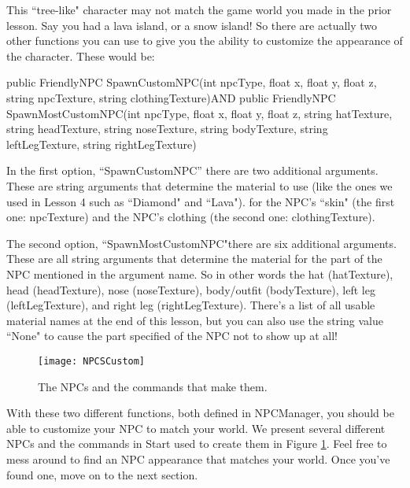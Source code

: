 \documentclass{article}
\begin{document}
This ``tree-like" character may not match the game world you made in the prior lesson. Say you had a lava island, or a snow island! So there are actually two other functions you can use to give you the ability to customize the appearance of the character. These would be: \newline

\noindent public FriendlyNPC SpawnCustomNPC(int npcType, float x, float y, float z, string npcTexture, string clothingTexture)\newline\newline AND \newline\newline\noindent public FriendlyNPC SpawnMostCustomNPC(int npcType, float x, float y, float z, string hatTexture, string headTexture, string noseTexture, string bodyTexture, string leftLegTexture, string rightLegTexture)\newline

In the first option, ``SpawnCustomNPC'' there are two additional arguments. These are string arguments that determine the material to use (like the ones we used in Lesson 4 such as ``Diamond" and ``Lava"). for the NPC's ``skin" (the first one: npcTexture) and the NPC's clothing (the second one: clothingTexture). 

The second option, ``SpawnMostCustomNPC"there are six additional arguments. These are all string arguments that determine the material for the part of the NPC mentioned in the argument name. So in other words the hat (hatTexture), head (headTexture), nose (noseTexture), body/outfit (bodyTexture), left leg (leftLegTexture), and right leg (rightLegTexture). There's a list of all usable material names at the end of this lesson, but you can also use the string value ``None" to cause the part specified of the NPC not to show up at all! 

\begin{figure}
  \texttt{[image: NPCSCustom]}
  \caption{The NPCs and the commands that make them.}
  \label{fig:NPCSCustom}
\end{figure}

With these two different functions, both defined in NPCManager, you should be able to customize your NPC to match your world. We present several different NPCs and the commands in Start used to create them in Figure \ref{fig:NPCSCustom}. Feel free to mess around to find an NPC appearance that matches your world. Once you've found one, move on to the next section.
\end{document}
